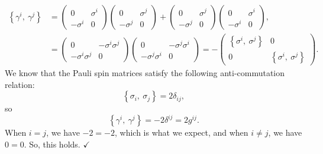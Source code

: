 \begin{enumerate}[leftmargin=0.5in]
\begin{align*}
            \left\{\gamma^i,\ \gamma^j\right\} &= \begin{pmatrix}0 & \sigma^i \\ -\sigma^i & 0\end{pmatrix}\begin{pmatrix}0 & \sigma^j \\ -\sigma^j & 0\end{pmatrix} + \begin{pmatrix}0 & \sigma^j \\ -\sigma^j & 0\end{pmatrix}\begin{pmatrix}0 & \sigma^i \\ -\sigma^i & 0\end{pmatrix}, \\
            &= \begin{pmatrix}0 & -\sigma^i\sigma^j \\ -\sigma^i\sigma^j & 0\end{pmatrix}\begin{pmatrix}0 & -\sigma^j\sigma^i \\ -\sigma^j\sigma^i & 0\end{pmatrix} = -\begin{pmatrix}\left\{\sigma^i,\ \sigma^j\right\} & 0 \\ 0 & \left\{\sigma^i,\ \sigma^j\right\}\end{pmatrix}.
        \end{align*}
        We know that the Pauli spin matrices satisfy the following anti-commutation relation:
        \begin{equation}
            \left\{\sigma_i,\ \sigma_j\right\} = 2\delta_{ij},
        \end{equation}
        so
        \begin{equation*}
            \left\{\gamma^i,\ \gamma^j\right\} = -2\delta^{ij} = 2g^{ij}.
        \end{equation*}
        When $i=j$, we have $-2=-2$, which is what we expect, and when $i\neq j$, we have $0=0$. So, this holds. $\checkmark$
\end{enumerate}